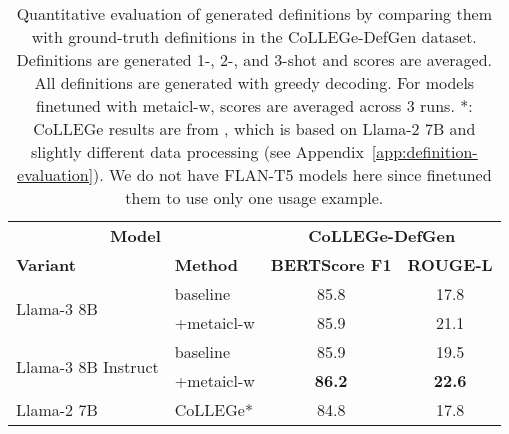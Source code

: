 \documentclass{article}
\begin{document}
\begin{table*}[t]
\small
\begin{center}
\begin{tabular}{p{2.7cm}l|cc}
\toprule
\multicolumn{2}{c|}{\bf Model} & \multicolumn{2}{c}{\bf CoLLEGe-DefGen} \\
\bf Variant & \bf Method & \bf BERTScore F1 & \bf ROUGE-L \\
\midrule
\multirow{2}{=}{Llama-3 8B}
& baseline                 & 85.8 & 17.8 \\
& +\ac{metaicl-w}          & 85.9 & 21.1 \\
\midrule
\multirow{2}{=}{Llama-3 8B Instruct}
& baseline                 & 85.9 & 19.5 \\
&+\ac{metaicl-w}           & \textbf{86.2} & \textbf{22.6} \\
\midrule
Llama-2 7B & CoLLEGe*      & 84.8 & 17.8 \\
\bottomrule
\end{tabular}
\end{center}
\caption{Quantitative evaluation of generated definitions by comparing them with ground-truth definitions in the CoLLEGe-DefGen dataset. Definitions are generated 1-, 2-, and 3-shot and scores are averaged. All definitions are generated with greedy decoding. For models finetuned with \ac{metaicl-w}, scores are averaged across 3 runs.
*: CoLLEGe results are from \citet{Teehan2024CoLLEGeCE}, which is based on Llama-2 7B and slightly different data processing (see Appendix~\ref{app:definition-evaluation}). We do not have \mbox{FLAN-T5} models here since \citet{giulianelli-etal-2023-interpretable} finetuned them to use only one usage example.}
\label{tab:definition-quantitative-defgen}
\end{table*}
\end{document}
